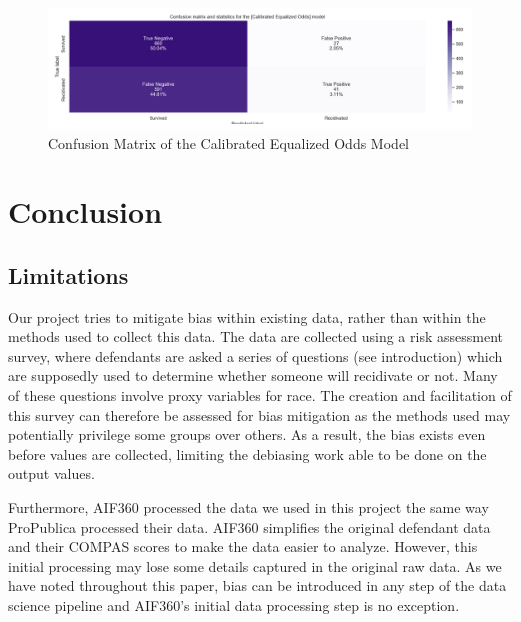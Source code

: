 \documentclass[water,article,submit,moreauthors,pdftex]{mdpi}
\begin{document}
\begin{figure}

{\centering \includegraphics[width=1\linewidth]{../images/ceo_matrix} 

}

\caption{Confusion Matrix of the Calibrated Equalized Odds Model}\label{fig:ceo matrix}
\end{figure}

\hypertarget{conclusion}{%
\section{Conclusion}\label{conclusion}}

\hypertarget{limitations}{%
\subsection{Limitations}\label{limitations}}

Our project tries to mitigate bias within existing data, rather than
within the methods used to collect this data. The data are collected
using a risk assessment survey, where defendants are asked a series of
questions (see introduction) which are supposedly used to determine
whether someone will recidivate or not. Many of these questions involve
proxy variables for race. The creation and facilitation of this survey
can therefore be assessed for bias mitigation as the methods used may
potentially privilege some groups over others. As a result, the bias
exists even before values are collected, limiting the debiasing work
able to be done on the output values.

Furthermore, AIF360 processed the data we used in this project the same
way ProPublica processed their data. AIF360 simplifies the original
defendant data and their COMPAS scores to make the data easier to
analyze. However, this initial processing may lose some details captured
in the original raw data. As we have noted throughout this paper, bias
can be introduced in any step of the data science pipeline and AIF360's
initial data processing step is no exception.
\end{document}
